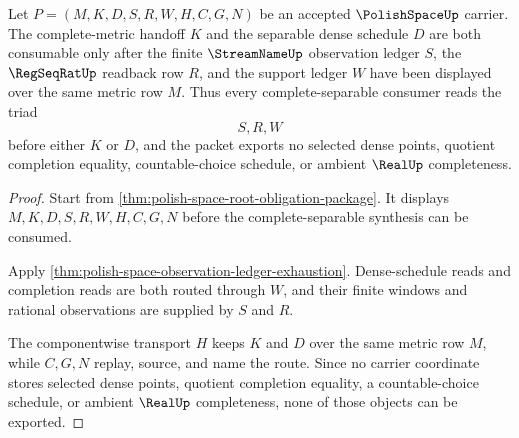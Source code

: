 \begin{theorem}
\label{thm:polish-space-completion-observation-triad}
Let $P=(M,K,D,S,R,W,H,C,G,N)$ be an accepted $\PolishSpaceUp$ carrier. The complete-metric handoff $K$ and the separable dense schedule $D$ are both consumable only after the finite $\StreamNameUp$ observation ledger $S$, the $\RegSeqRatUp$ readback row $R$, and the support ledger $W$ have been displayed over the same metric row $M$. Thus every complete-separable consumer reads the triad
$$
S,R,W
$$
before either $K$ or $D$, and the packet exports no selected dense points, quotient completion equality, countable-choice schedule, or ambient $\RealUp$ completeness.
\end{theorem}
\begin{proof}
Start from \autoref{thm:polish-space-root-obligation-package}. It displays $M,K,D,S,R,W,H,C,G,N$ before the complete-separable synthesis can be consumed.

Apply \autoref{thm:polish-space-observation-ledger-exhaustion}. Dense-schedule reads and completion reads are both routed through $W$, and their finite windows and rational observations are supplied by $S$ and $R$.

The componentwise transport $H$ keeps $K$ and $D$ over the same metric row $M$, while $C,G,N$ replay, source, and name the route. Since no carrier coordinate stores selected dense points, quotient completion equality, a countable-choice schedule, or ambient $\RealUp$ completeness, none of those objects can be exported.
\end{proof}

